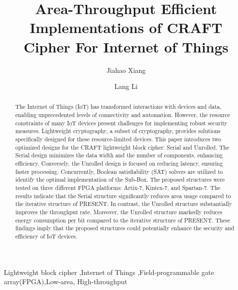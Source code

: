 \documentclass[final,5p,times,twocolumn]{elsarticle}
\begin{document}
\begin{frontmatter}

    \title{Area-Throughput Efficient Implementations of CRAFT Cipher For Internet of Things }

    \author[a,b]{Jiahao Xiang}
    \author[a,b]{Lang Li}







    \begin{abstract}
        The Internet of Things (IoT) has transformed interactions with devices and data, enabling unprecedented levels of connectivity and automation. However, the resource constraints of many IoT devices present challenges for implementing robust security measures. Lightweight cryptography, a subset of cryptography, provides solutions specifically designed for these resource-limited devices.
        This paper introduces two optimized designs for the CRAFT lightweight block cipher: Serial and Unrolled. The Serial design minimizes the data width and the number of components, enhancing efficiency. Conversely, the Unrolled design is focused on reducing latency, ensuring faster processing. Concurrently, Boolean satisfiability (SAT) solvers are utilized to identify the optimal implementation of the Sub-Box.
        The proposed structures were tested on three different FPGA platforms: Artix-7, Kintex-7, and Spartan-7. The results indicate that the Serial structure significantly reduces area usage compared to the iterative structure of PRESENT. In contrast, the Unrolled structure substantially improves the throughput rate. Moreover, the Unrolled structure markedly reduces energy consumption per bit compared to the iterative structure of PRESENT.
        These findings imply that the proposed structures could potentially enhance the security and efficiency of IoT devices.
    \end{abstract}


    \begin{keyword}
        Lightweight block cipher \sep Internet of Things  \sep Field-programmable gate array(FPGA)\sep  Low-area, High-throughput

    \end{keyword}

\end{frontmatter}
\end{document}
